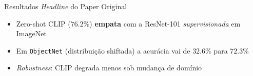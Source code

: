 \documentclass[aspectratio=169,xcolor=dvipsnames]{beamer}
\begin{document}
  \begin{frame}{Resultados \textit{Headline} do Paper Original}
    \centering

    \vspace{0.6em}
    \begin{itemize}\setlength{\itemsep}{0pt}
      \item Zero-shot CLIP ($76.2\%$) \textbf{empata} com a ResNet-101 \emph{supervisionada} em ImageNet
      \item Em \texttt{ObjectNet} (distribuição shiftada) a acurácia vai de $32.6\%$ para $72.3\%$
      \item \textit{Robustness}: CLIP degrada menos sob mudança de domínio
    \end{itemize}
  \end{frame}
\end{document}
